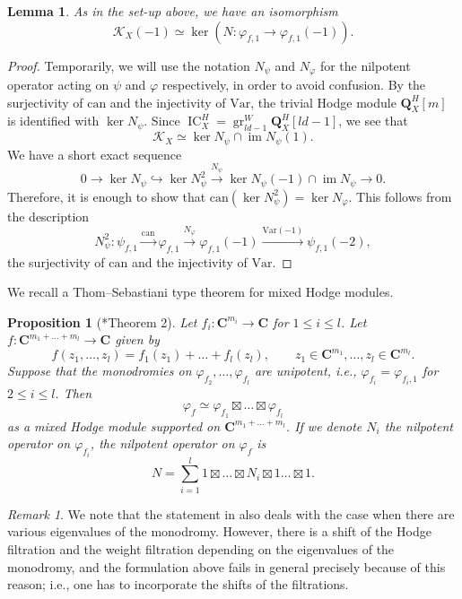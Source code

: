 \documentclass[letterpaper,11pt]{amsart}
\theoremstyle{plain}
\newtheorem{lemm}[theo]{Lemma}
\newtheorem{prop}[theo]{Proposition}
\theoremstyle{definition}
\theoremstyle{remark}
\newtheorem{rema}[theo]{Remark}
\newcommand{\QQ}{\mathbf{Q}}
\newcommand{\CC}{\mathbf{C}}
\newcommand{\cK}{\mathcal{K}}
\DeclareMathOperator{\im}{im}
\DeclareMathOperator{\gr}{gr}
\DeclareMathOperator{\IC}{IC}
\begin{document}
    \begin{lemm} \label{lemm:defect-is-kernel-of-N}
        As in the set-up above, we have an isomorphism
        $$ \cK_{X}(-1) \simeq \ker (N \colon \varphi_{f,1} \to \varphi_{f, 1}(-1)).$$
    \end{lemm}
    \begin{proof}
        Temporarily, we will use the notation $N_{\psi}$ and $N_{\varphi}$ for the nilpotent operator acting on $\psi$ and $\varphi$ respectively, in order to avoid confusion. By the surjectivity of $\mathrm{can}$ and the injectivity of $\mathrm{Var}$, the trivial Hodge module $\QQ_{X}^{H}[m]$ is identified with $\ker N_{\psi}$. Since $\IC_{X}^{H} = \gr_{ld-1}^{W} \QQ_{X}^{H}[ld-1]$, we see that
        $$ \cK_{X} \simeq \ker N_{\psi} \cap \im N_{\psi}(1).$$
        We have a short exact sequence
        $$ 0 \to \ker N_{\psi} \hookrightarrow \ker N_{\psi}^{2} \xrightarrow{N_{\psi}}  \ker N_{\psi}(-1) \cap \im N_{\psi} \to 0.$$
        Therefore, it is enough to show that $\mathrm{can}(\ker N_{\psi}^{2}) = \ker N_{\varphi}$. This follows from the description
        $$ N_{\psi}^{2} \colon \psi_{f,1} \xrightarrow{\mathrm{can}} \varphi_{f,1} \xrightarrow{N_{\varphi}} \varphi_{f,1}(-1) \xrightarrow{ \mathrm{Var}(-1)} \psi_{f,1}(-2),$$
        the surjectivity of $\mathrm{can}$ and the injectivity of $\mathrm{Var}$.
    \end{proof}

    We recall a Thom--Sebastiani type theorem for mixed Hodge modules.
    \begin{prop}[\cite{Maxim-Schurmann-Saito:Thom-Sebastiani}*{Theorem 2}] \label{prop:Thom-Sebastiani}
        Let $f_{i} \colon \CC^{m_{i}}\to \CC$ for $1 \leq i \leq l$. Let $f \colon \CC^{m_{1}+ \ldots + m_{l}} \to \CC$ given by
        $$ f(z_1,\ldots, z_{l}) = f_{1}(z_{1}) + \ldots + f_{l}(z_{l}), \qquad z_{1} \in \CC^{m_{1}},\ldots, z_{l} \in \CC^{m_{l}}.$$
        Suppose that the monodromies on $\varphi_{f_{2}},\ldots, \varphi_{f_{l}}$ are unipotent, i.e., $\varphi_{f_{i}} = \varphi_{f_{i},1}$ for $2\leq i \leq l$. Then
        $$ \varphi_{f} \simeq \varphi_{f_{1}} \boxtimes \ldots \boxtimes \varphi_{f_{l}}$$
        as a mixed Hodge module supported on $\CC^{m_{1} + \ldots + m_{l}}$. If we denote $N_{i}$ the nilpotent operator on $\varphi_{f_{i}}$, the nilpotent operator on $\varphi_{f}$ is
        $$ N = \sum_{i=1}^{l} 1 \boxtimes \ldots \boxtimes N_{i} \boxtimes 1 \ldots \boxtimes 1.$$
    \end{prop}
    \begin{rema}
        We note that the statement in \cite{Maxim-Schurmann-Saito:Thom-Sebastiani} also deals with the case when there are various eigenvalues of the monodromy. However, there is a shift of the Hodge filtration and the weight filtration depending on the eigenvalues of the monodromy, and the formulation above fails in general precisely because of this reason; i.e., one has to incorporate the shifts of the filtrations.
    \end{rema}
\end{document}
